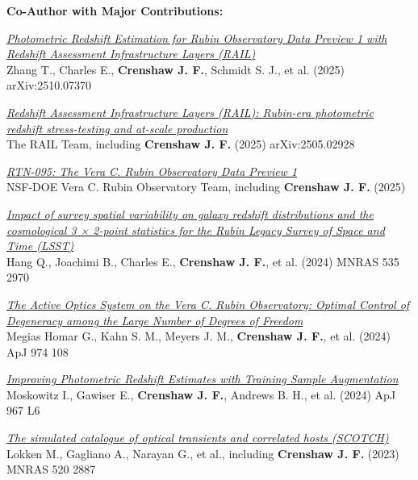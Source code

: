 \textbf{Co-Author with Major Contributions:}
\begin{etaremune}
\item \href{https://ui.adsabs.harvard.edu/abs/2025arXiv251007370Z}{\textit{Photometric Redshift Estimation for Rubin Observatory Data Preview 1 with Redshift Assessment Infrastructure Layers (RAIL)}} \\ 
Zhang T., Charles E., \textbf{Crenshaw J. F.}, Schmidt S. J., et al. (2025) 
arXiv:2510.07370 

\item \href{https://ui.adsabs.harvard.edu/abs/2025arXiv250502928T}{\textit{Redshift Assessment Infrastructure Layers (RAIL): Rubin-era photometric redshift stress-testing and at-scale production}} \\ 
The RAIL Team, including \textbf{Crenshaw J. F.} (2025) 
arXiv:2505.02928 

\item \href{https://ui.adsabs.harvard.edu/abs/2025rubn.rept...31N}{\textit{RTN-095: The Vera C. Rubin Observatory Data Preview 1}} \\ 
NSF-DOE Vera C. Rubin Observatory Team, including \textbf{Crenshaw J. F.} (2025) 

\item \href{https://ui.adsabs.harvard.edu/abs/2024MNRAS.535.2970H}{\textit{Impact of survey spatial variability on galaxy redshift distributions and the cosmological 3 × 2-point statistics for the Rubin Legacy Survey of Space and Time (LSST)}} \\ 
Hang Q., Joachimi B., Charles E., \textbf{Crenshaw J. F.}, et al. (2024) 
MNRAS 535 2970 

\item \href{https://ui.adsabs.harvard.edu/abs/2024ApJ...974..108M}{\textit{The Active Optics System on the Vera C. Rubin Observatory: Optimal Control of Degeneracy among the Large Number of Degrees of Freedom}} \\ 
Megias Homar G., Kahn S. M., Meyers J. M., \textbf{Crenshaw J. F.}, et al. (2024) 
ApJ 974 108 

\item \href{https://ui.adsabs.harvard.edu/abs/2024ApJ...967L...6M}{\textit{Improving Photometric Redshift Estimates with Training Sample Augmentation}} \\ 
Moskowitz I., Gawiser E., \textbf{Crenshaw J. F.}, Andrews B. H., et al. (2024) 
ApJ 967 L6 

\item \href{https://ui.adsabs.harvard.edu/abs/2023MNRAS.520.2887L}{\textit{The simulated catalogue of optical transients and correlated hosts (SCOTCH)}} \\ 
Lokken M., Gagliano A., Narayan G., et al., including \textbf{Crenshaw J. F.} (2023) 
MNRAS 520 2887 


\end{etaremune}
